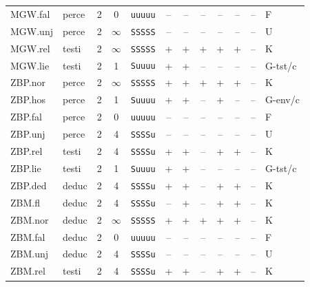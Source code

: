{\begin{longtable}{@{}llcccccccccl@{}}
MGW.fal & perce & 2 & 0 & \texttt{uuuuu} & \textsf{--} & \textsf{--} & \textsf{--} & \textsf{--} & \textsf{--} & -- & F \\
MGW.unj & perce & 2 & $\infty$ & \texttt{SSSSS} & \textsf{--} & \textsf{--} & \textsf{--} & \textsf{--} & \textsf{--} & -- & U \\
MGW.rel & testi & 2 & $\infty$ & \texttt{SSSSS} & \textsf{+} & \textsf{+} & \textsf{+} & \textsf{+} & \textsf{+} & -- & K \\
MGW.lie & testi & 2 & 1 & \texttt{Suuuu} & \textsf{+} & \textsf{+} & \textsf{--} & \textsf{--} & \textsf{--} & -- & G-tst/c \\
ZBP.nor & perce & 2 & $\infty$ & \texttt{SSSSS} & \textsf{+} & \textsf{+} & \textsf{+} & \textsf{+} & \textsf{+} & -- & K \\
ZBP.hos & perce & 2 & 1 & \texttt{Suuuu} & \textsf{+} & \textsf{+} & \textsf{--} & \textsf{+} & \textsf{--} & -- & G-env/c \\
ZBP.fal & perce & 2 & 0 & \texttt{uuuuu} & \textsf{--} & \textsf{--} & \textsf{--} & \textsf{--} & \textsf{--} & -- & F \\
ZBP.unj & perce & 2 & 4 & \texttt{SSSSu} & \textsf{--} & \textsf{--} & \textsf{--} & \textsf{--} & \textsf{--} & -- & U \\
ZBP.rel & testi & 2 & 4 & \texttt{SSSSu} & \textsf{+} & \textsf{+} & \textsf{--} & \textsf{+} & \textsf{+} & -- & K \\
ZBP.lie & testi & 2 & 1 & \texttt{Suuuu} & \textsf{+} & \textsf{+} & \textsf{--} & \textsf{--} & \textsf{--} & -- & G-tst/c \\
ZBP.ded & deduc & 2 & 4 & \texttt{SSSSu} & \textsf{+} & \textsf{+} & \textsf{--} & \textsf{+} & \textsf{+} & -- & K \\
ZBM.fl & deduc & 2 & 4 & \texttt{SSSSu} & \textsf{--} & \textsf{+} & \textsf{--} & \textsf{+} & \textsf{+} & -- & K \\
ZBM.nor & deduc & 2 & $\infty$ & \texttt{SSSSS} & \textsf{+} & \textsf{+} & \textsf{+} & \textsf{+} & \textsf{+} & -- & K \\
ZBM.fal & deduc & 2 & 0 & \texttt{uuuuu} & \textsf{--} & \textsf{--} & \textsf{--} & \textsf{--} & \textsf{--} & -- & F \\
ZBM.unj & deduc & 2 & 4 & \texttt{SSSSu} & \textsf{--} & \textsf{--} & \textsf{--} & \textsf{--} & \textsf{--} & -- & U \\
ZBM.rel & testi & 2 & 4 & \texttt{SSSSu} & \textsf{+} & \textsf{+} & \textsf{--} & \textsf{+} & \textsf{+} & -- & K \\

\end{longtable}}
